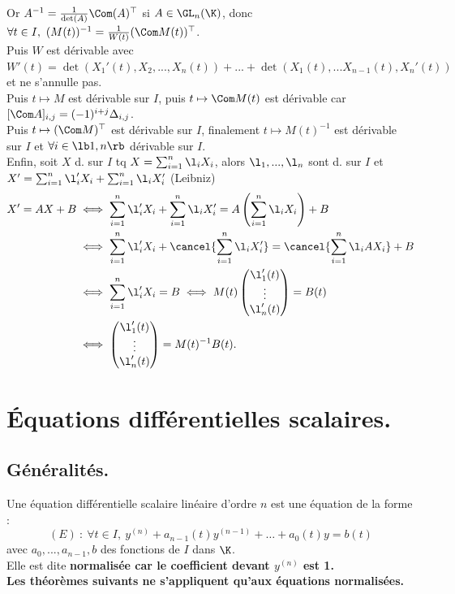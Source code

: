 \documentclass[11pt]{article}
\begin{document}
Or $A^{-1}=\frac{1}{\det(A)}\Com(A)^\top$ si $A\in\GL_n(\K)$, donc $\forall t \in I, ~ (M(t))^{-1}=\frac{1}{W(t)}(\Com M(t))^\top$.\\
Puis $W$ est dérivable avec $W'(t)=\det(X_1'(t),X_2,...,X_n(t))+...+\det(X_1(t),...X_{n-1}(t),X_n'(t))$ et ne s'annulle pas.\\
Puis $t\mapsto M$ est dérivable sur $I$, puis $t\mapsto \Com M(t)$ est dérivable car $[\Com A]_{i,j}=(-1)^{i+j}\Delta_{i,j}$.\\
Puis $t\mapsto (\Com M)^\top$ est dérivable sur $I$, finalement $t\mapsto M(t)^{-1}$ est dérivable sur $I$ et $\forall i \in \lb1,n\rb$ dérivable sur $I$.\\
Enfin, soit $X$ d. sur $I$ tq $X=\sum_{i=1}^n\l_iX_i$, alors $\l_1,...,\l_n$ sont d. sur $I$ et $X'=\sum_{i=1}^n\l_i'X_i + \sum_{i=1}^n\l_i X_i'$ (Leibniz)
\begin{align*}
    X' = AX + B &\iff \sum_{i=1}^n \l_i'X_i + \sum_{i=1}^n\l_iX'_i = A\left( \sum_{i=1}^n \l_i X_i \right) + B \\
    &\iff \sum_{i=1}^n \l_i' X_i + \cancel{\sum_{i=1}^n \l_i X_i'} = \cancel{\sum_{i=1}^n \l_i AX_i} + B\\
    &\iff \sum_{i=1}^n \l_i'X_i = B \iff M(t)\begin{pmatrix}\l'_1(t) \\ \vdots \\ \l'_n(t)\end{pmatrix} = B(t) \\
    &\iff \begin{pmatrix}\l_1'(t) \\ \vdots \\ \l_n'(t)\end{pmatrix} = M(t)^{-1}B(t).
\end{align*}

\section{Équations différentielles scalaires.}

\subsection{Généralités.}

\begin{defi}{}{}
    Une équation différentielle scalaire linéaire d'ordre $n$ est une équation de la forme :
    \begin{equation*}
        (E) ~:~ \forall t \in I, ~ y^{(n)} + a_{n-1}(t)y^{(n-1)} + \dots + a_0(t)y = b(t)
    \end{equation*}
    avec $a_0,...,a_{n-1},b$ des fonctions de $I$ dans $\K$.\\
    Elle est dite \bf{normalisée} car le coefficient devant $y^{(n)}$ est 1.\\Les théorèmes suivants ne s'appliquent qu'aux équations normalisées.
\end{defi}
\end{document}
